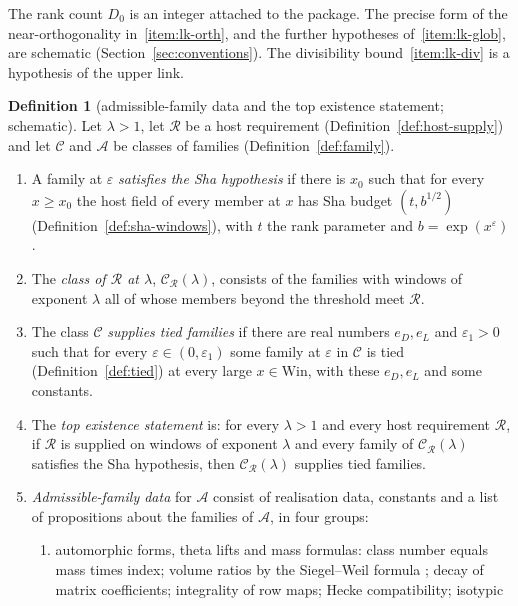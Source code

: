 \documentclass[11pt]{amsbook}
\theoremstyle{plain}
\theoremstyle{definition}
\newtheorem{definition}[theorem]{Definition}
\theoremstyle{remark}
\numberwithin{equation}{section}
\numberwithin{figure}{chapter}
\numberwithin{table}{chapter}
\newcommand{\eps}{\varepsilon}
\newcommand{\Win}{\mathrm{Win}}
\begin{document}
\noindent The rank count $D_0$ is an integer attached to the
package. The precise form of the near-orthogonality
in~\ref{item:lk-orth}, and the further hypotheses
of~\ref{item:lk-glob}, are schematic (Section~\ref{sec:conventions}).
The divisibility bound~\ref{item:lk-div} is a hypothesis of the upper link.

\begin{definition}[admissible-family data and the top existence
statement; schematic]\label{def:admissible}
Let $\lambda>1$, let $\mathscr R$ be a host requirement
(Definition~\ref{def:host-supply}) and let $\mathcal C$ and
$\mathcal A$ be classes of families (Definition~\ref{def:family}).
\begin{enumerate}[label=(\arabic*)]
\item\label{item:ad-sha}
A family at $\eps$ \emph{satisfies the Sha hypothesis} if there is $x_0$
such that for every $x\ge x_0$ the host field of every member at $x$
has Sha budget $(t,b^{1/2})$ (Definition~\ref{def:sha-windows}), with
$t$ the rank parameter and $b=\exp(x^\eps)$.
\item The \emph{class of $\mathscr R$ at $\lambda$},
$\mathcal C_{\mathscr R}(\lambda)$, consists of the families with
windows of exponent $\lambda$ all of whose members beyond the
threshold meet $\mathscr R$.
\item The class $\mathcal C$ \emph{supplies tied families} if there are real
numbers $e_D,e_L$ and $\eps_1>0$ such that for every
$\eps\in(0,\eps_1)$ some family at $\eps$ in $\mathcal C$ is tied
(Definition~\ref{def:tied}) at every large $x\in\Win$, with these
$e_D,e_L$ and some constants.
\item The \emph{top existence statement} is: for every $\lambda>1$ and
every host requirement $\mathscr R$, if
$\mathscr R$ is supplied on windows of exponent $\lambda$ and every family of
$\mathcal C_{\mathscr R}(\lambda)$ satisfies the Sha hypothesis, then
$\mathcal C_{\mathscr R}(\lambda)$ supplies tied families.
\item\label{item:ad-data}
\emph{Admissible-family data} for $\mathcal A$ consist of
realisation data, constants and a list of propositions about the
families of $\mathcal A$, in four groups:
\begin{enumerate}[label=(\alph*)]
\item automorphic forms, theta lifts and mass formulas: class number
equals mass times index; volume ratios by the Siegel--Weil formula
\cite{Weil1965,KudlaRallis1988,Ichino2004}; decay of matrix
coefficients; integrality of row maps; Hecke compatibility; isotypic

\end{enumerate}
\end{enumerate}
\end{definition}
\end{document}
